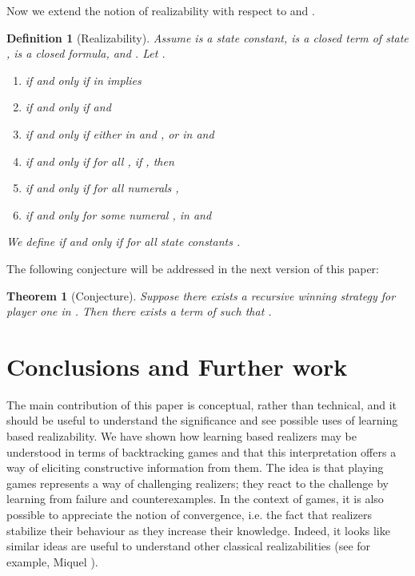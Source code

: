 \documentclass[copyright,creativecommons]{eptcs}
\newtheorem{theorem}{Theorem}
\newtheorem{definition}{Definition}
\begin{document}
Now we extend the notion of realizability with respect to  and .


\begin{definition}[Realizability]
\label{lemma-IndexedRealizabilityAndRealizability2}
Assume  is a state constant,  is a closed term of state ,  is a closed formula, and . Let .

\begin{enumerate}
\item
 if and only if  in  implies



\item
 if and only if  and 

\item
  if and only if either  in  and , or  in  and 

\item
 if and only if for all , if ,
then 

\item
 if and only if for all numerals ,

\item

 if and only for some numeral ,  in  and 
\end{enumerate}
We define  if and only if  for all state constants .
\end{definition}

The following conjecture will be addressed in the next version of this paper:

\begin{theorem}[Conjecture]
Suppose there exists a recursive winning strategy for player one in . Then there exists a term  of  such that .

\end{theorem}

\section{Conclusions and Further work}

The main contribution of this paper is conceptual, rather than technical, and it should be useful to understand the significance and see possible uses of learning based realizability. We have shown how learning based realizers may be understood in terms of backtracking games and that this interpretation offers a way of eliciting constructive information from them. The idea is that playing games represents a way of challenging realizers; they react to the challenge by learning from failure and counterexamples. In the context of games, it is also possible to appreciate the notion of convergence, i.e. the fact that realizers stabilize their behaviour as they increase their knowledge. Indeed, it looks like similar ideas are useful to understand other classical realizabilities (see for example, Miquel \cite{Miq}). 
\end{document}
